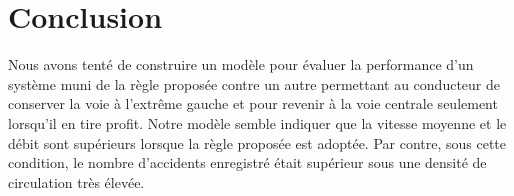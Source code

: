 \documentclass[12pt,letterpaper]{article}
\begin{document}




\section{Conclusion}

Nous avons tenté de construire un modèle pour évaluer la performance d'un système muni de la règle
proposée contre un autre permettant au conducteur de conserver la voie à l'extrême gauche et pour
revenir à la voie centrale seulement lorsqu'il en tire profit. Notre modèle semble indiquer que la
vitesse moyenne et le débit sont supérieurs lorsque la règle proposée est adoptée. Par contre, sous
cette condition, le nombre d'accidents enregistré était supérieur sous une densité de circulation
très élevée.
\end{document}
